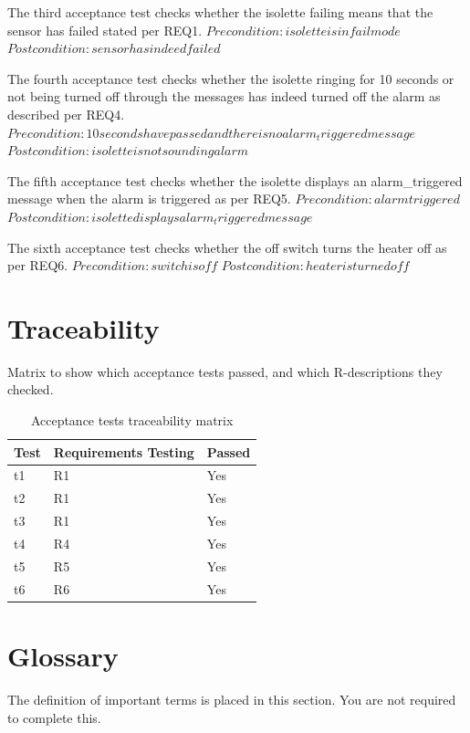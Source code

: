 \documentclass[fontsize=12pt,paper=letter,twoside]{scrartcl}
\begin{document}
\noindent The third acceptance test checks whether the isolette failing means that the sensor has failed stated per REQ1.
$Precondition: isolette is in fail mode$
$Postcondition: sensor has indeed failed$


\noindent The fourth acceptance test checks whether the isolette ringing for 10 seconds or not being turned off through the messages has indeed turned off the alarm as described per REQ4.
$Precondition: 10 seconds have passed and there is no alarm_triggered message$
$Postcondition: isolette is not sounding alarm$


\noindent The fifth acceptance test checks whether the isolette displays an alarm_triggered message when the alarm is triggered as per REQ5.
$Precondition: alarm triggered$
$Postcondition: isolette displays alarm_triggered message$


\noindent The sixth acceptance test checks whether the off switch turns the heater off as per REQ6.
$Precondition: switch is off$
$Postcondition: heater is turned off$

\section{Traceability}
Matrix to show which acceptance tests passed, and which R-descriptions they checked.

\begin{table}[htb]
\centering
\label{my-label}
\begin{tabular}{|l|l|l|}
\hline
Test & Requirements Testing & Passed \\ \hline
t1   & R1                   & Yes    \\ \hline
t2   & R1                   & Yes    \\ \hline
t3   & R1                   & Yes    \\ \hline
t4   & R4                   & Yes    \\ \hline
t5   & R5                   & Yes    \\ \hline
t6   & R6                   & Yes    \\ \hline
\end{tabular}
\caption{Acceptance tests traceability matrix}
\end{table}

\section{Glossary}
The definition of important terms is placed in this section. You are not required to complete this.



\end{document}
